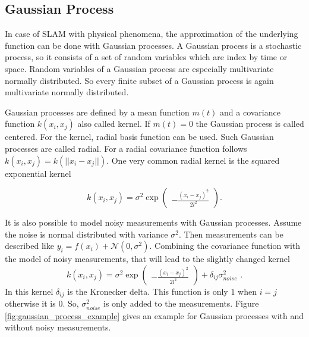 \subsection{Gaussian Process}
\label{chap:gaussian}
In case of SLAM with physical phenomena, the approximation of the underlying function can be done 
with Gaussian processes. A Gaussian process is a stochastic process, so it consists of a set of random
variables which are index by time or space. Random variables of a Gaussian process are especially multivariate
normally distributed. So every finite subset of a Gaussian process is again multivariate normally distributed.

Gaussian processes are defined by a mean function $m(t)$ and a covariance function $k(x_i, x_j)$ also called kernel.
If $m(t) = 0$ the Gaussian process is called centered. For the kernel, radial basis function can be used. Such
Gaussian processes are called radial. For a radial covariance function follows $k(x_i, x_j) = k(||x_i - x_j||)$. 
One very common radial kernel is the squared exponential kernel \cite{ebden_gaussian_2015}

$$
k(x_i, x_j) = \sigma ^2 \exp 
\begin{pmatrix}
	-\frac{(x_i - x_j)^2}{2l^2}
\end{pmatrix}\text{.}
$$

It is also possible to model noisy measurements with Gaussian processes. Assume the noise is normal distributed
with variance $\sigma^2$. Then measurements can be described like $y_i = f(x_i) + \mathcal{N}(0, \sigma^2)$.
Combining the covariance function with the model of noisy measurements, that will lead to the slightly 
changed kernel
$$
k(x_i, x_j) = \sigma ^2 \exp 
\begin{pmatrix}
	-\frac{(x_i - x_j)^2}{2l^2}
\end{pmatrix}
+ \delta_{ij} \sigma^2_{noise}\text{ .}
$$
In this kernel $\delta_{ij}$ is the Kronecker delta. This function is only $1$ when $i=j$ otherwise it is $0$. 
So, $\sigma^2_{noise}$ is only added to the measurements. Figure \ref{fig:gaussian_process_example} gives an example 
for Gaussian processes with and without noisy measurements.

